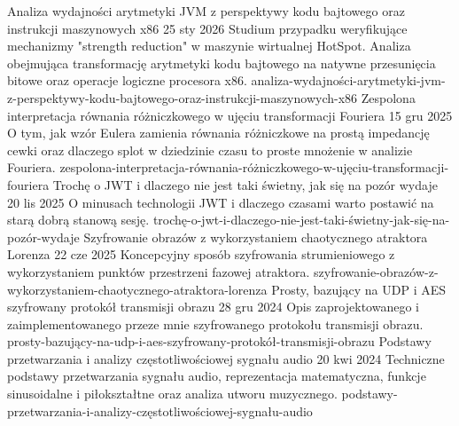 
\newcommand{\BlogTitle}{Blog techniczny}
\newcommand{\BlogNote}{}
\renewcommand{\BlogList}{}
\AddBlogEntry
  {Analiza wydajności arytmetyki JVM z perspektywy kodu bajtowego oraz instrukcji maszynowych x86}
  {25 sty 2026}
  {%
    Studium przypadku weryfikujące mechanizmy "strength reduction" w maszynie wirtualnej HotSpot. Analiza obejmująca
    transformację arytmetyki kodu bajtowego na natywne przesunięcia bitowe oraz operacje logiczne procesora x86.
  }
  {analiza-wydajności-arytmetyki-jvm-z-perspektywy-kodu-bajtowego-oraz-instrukcji-maszynowych-x86}
\AddBlogEntry
  {Zespolona interpretacja równania różniczkowego w ujęciu transformacji Fouriera}
  {15 gru 2025}
  {%
    O tym, jak wzór Eulera zamienia równania różniczkowe na prostą impedancję cewki oraz dlaczego splot w dziedzinie
    czasu to proste mnożenie w analizie Fouriera.
  }
  {zespolona-interpretacja-równania-różniczkowego-w-ujęciu-transformacji-fouriera}
\AddBlogEntry
  {Trochę o JWT i dlaczego nie jest taki świetny, jak się na pozór wydaje}
  {20 lis 2025}
  {O minusach technologii JWT i dlaczego czasami warto postawić na starą dobrą stanową sesję.}
  {trochę-o-jwt-i-dlaczego-nie-jest-taki-świetny-jak-się-na-pozór-wydaje}
\AddBlogEntry
  {Szyfrowanie obrazów z wykorzystaniem chaotycznego atraktora Lorenza}
  {22 cze 2025}
  {Koncepcyjny sposób szyfrowania strumieniowego z wykorzystaniem punktów przestrzeni fazowej atraktora.}
  {szyfrowanie-obrazów-z-wykorzystaniem-chaotycznego-atraktora-lorenza}
\AddBlogEntry
  {Prosty, bazujący na UDP i AES szyfrowany protokół transmisji obrazu}
  {28 gru 2024}
  {Opis zaprojektowanego i zaimplementowanego przeze mnie szyfrowanego protokołu transmisji obrazu.}
  {prosty-bazujący-na-udp-i-aes-szyfrowany-protokół-transmisji-obrazu}
\AddBlogEntry
  {Podstawy przetwarzania i analizy częstotliwościowej sygnału audio}
  {20 kwi 2024}
  {%
    Techniczne podstawy przetwarzania sygnału audio, reprezentacja matematyczna, funkcje sinusoidalne i piłokształtne
    oraz analiza utworu muzycznego.
  }
  {podstawy-przetwarzania-i-analizy-częstotliwościowej-sygnału-audio}


